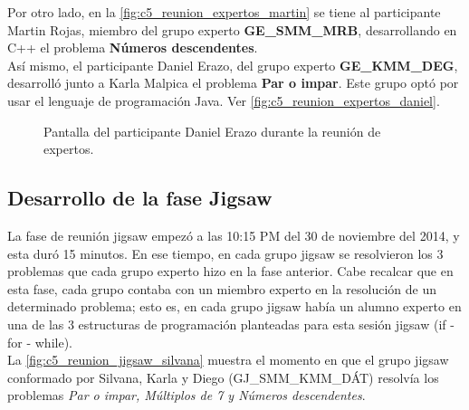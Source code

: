 Por otro lado, en la \autoref{fig:c5_reunion_expertos_martin} se tiene al participante Martin Rojas, miembro del grupo experto \textbf{GE\_SMM\_MRB}, desarrollando en C++ el problema \textbf{Números descendentes}.\\

Así mismo, el participante Daniel Erazo, del grupo experto \textbf{GE\_KMM\_DEG},  desarrolló junto a Karla Malpica el problema \textbf{Par o impar}. Este grupo optó por usar el lenguaje de programación Java. Ver \autoref{fig:c5_reunion_expertos_daniel}.

\begin{figure}
	\centering
	\caption[Reunión de Expertos - Daniel Erazo]{Pantalla del participante Daniel Erazo durante la reunión de expertos.}
	\label{fig:c5_reunion_expertos_daniel}
\end{figure}

\subsection{Desarrollo de la fase Jigsaw}
La fase de reunión jigsaw empezó a las 10:15 PM del 30 de noviembre del 2014, y esta duró 15 minutos. En ese tiempo, en cada grupo jigsaw se resolvieron los 3 problemas que cada grupo experto hizo en la fase anterior. Cabe recalcar que en esta fase, cada grupo contaba con un miembro experto en la resolución de un determinado problema; esto es, en cada grupo jigsaw había un alumno experto en una de las 3 estructuras de programación planteadas para esta sesión jigsaw (if - for - while).\\

La \autoref{fig:c5_reunion_jigsaw_silvana} muestra el momento en que el grupo jigsaw conformado por Silvana, Karla y Diego (GJ\_SMM\_KMM\_DÁT) resolvía los problemas \emph{Par o impar, Múltiplos de 7 y Números descendentes}.

